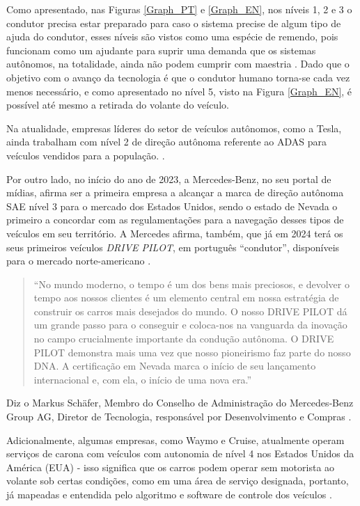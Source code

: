 Como apresentado, nas Figuras \ref{Graph_PT} e \ref{Graph_EN}, nos níveis 1, 2 e 3 o condutor precisa estar preparado para caso o sistema precise de algum tipo de ajuda do condutor, esses níveis são vistos como uma espécie de remendo, pois funcionam como um ajudante para suprir uma demanda que os sistemas autônomos, na totalidade, ainda não podem cumprir com maestria \cite{4cenarios_ocidental}. Dado que o objetivo com o avanço da tecnologia é que o condutor humano torna-se cada vez menos necessário, e como apresentado no nível 5, visto na Figura \ref{Graph_EN}, é possível até mesmo a retirada do volante do veículo. 

Na atualidade, empresas líderes do setor de veículos autônomos, como a Tesla, ainda trabalham com nível 2 de direção autônoma referente ao ADAS para veículos vendidos para a população. \cite{4cenarios_ocidental}.

Por outro lado, no início do ano de 2023, a Mercedes-Benz, no seu portal de mídias, afirma ser a primeira empresa a alcançar a marca de direção autônoma SAE nível 3 para o mercado dos Estados Unidos, sendo o estado de Nevada o primeiro a concordar com as regulamentações para a navegação desses tipos de veículos em seu território. A Mercedes afirma, também, que já em 2024 terá os seus primeiros veículos \textit{DRIVE PILOT}, em português “condutor”, disponíveis para o mercado norte-americano \cite{mercedes3}.
\begin{quote}
“No mundo moderno, o tempo é um dos bens mais preciosos, e devolver o tempo aos nossos clientes é um elemento central em nossa estratégia de construir os carros mais desejados do mundo. O nosso DRIVE PILOT dá um grande passo para o conseguir e coloca-nos na vanguarda da inovação no campo crucialmente importante da condução autônoma. O DRIVE PILOT demonstra mais uma vez que nosso pioneirismo faz parte do nosso DNA. A certificação em Nevada marca o início de seu lançamento internacional e, com ela, o início de uma nova era.”
\end{quote}
Diz o Markus Schäfer, Membro do Conselho de Administração do Mercedes‑Benz Group AG, Diretor de Tecnologia, responsável por Desenvolvimento e Compras \cite{mercedes3}.

Adicionalmente, algumas empresas, como Waymo e Cruise, atualmente operam serviços de carona com veículos com autonomia de nível 4 nos Estados Unidos da América (EUA) - isso significa que os carros podem operar sem motorista ao volante sob certas condições, como em uma área de serviço designada, portanto, já mapeadas e entendida pelo algoritmo e software de controle dos veículos \cite{Houser2023-dn}.


